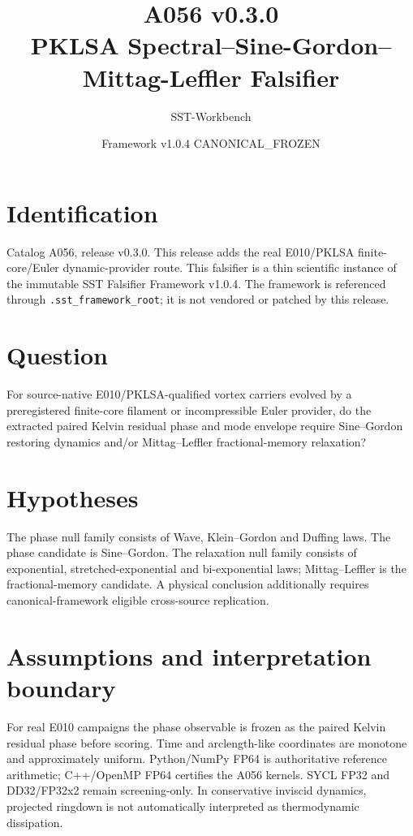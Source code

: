 \documentclass[11pt,a4paper]{article}
\title{A056 v0.3.0\\PKLSA Spectral--Sine-Gordon--Mittag-Leffler Falsifier}
\author{SST-Workbench}
\date{Framework v1.0.4 CANONICAL\_FROZEN}
\newcommand{\code}[1]{\texttt{#1}}
\begin{document}
\maketitle

\section{Identification}
Catalog A056, release v0.3.0. This release adds the real E010/PKLSA finite-core/Euler dynamic-provider route. This falsifier is a thin scientific instance of the immutable SST Falsifier Framework v1.0.4. The framework is referenced through \code{.sst\_framework\_root}; it is not vendored or patched by this release.

\section{Question}
For source-native E010/PKLSA-qualified vortex carriers evolved by a preregistered finite-core filament or incompressible Euler provider, do the extracted paired Kelvin residual phase and mode envelope require Sine--Gordon restoring dynamics and/or Mittag--Leffler fractional-memory relaxation?

\section{Hypotheses}
The phase null family consists of Wave, Klein--Gordon and Duffing laws. The phase candidate is Sine--Gordon. The relaxation null family consists of exponential, stretched-exponential and bi-exponential laws; Mittag--Leffler is the fractional-memory candidate. A physical conclusion additionally requires canonical-framework eligible cross-source replication.

\section{Assumptions and interpretation boundary}
For real E010 campaigns the phase observable is frozen as the paired Kelvin residual phase before scoring. Time and arclength-like coordinates are monotone and approximately uniform. Python/NumPy FP64 is authoritative reference arithmetic; C++/OpenMP FP64 certifies the A056 kernels. SYCL FP32 and DD32/FP32x2 remain screening-only. In conservative inviscid dynamics, projected ringdown is not automatically interpreted as thermodynamic dissipation.
\end{document}
